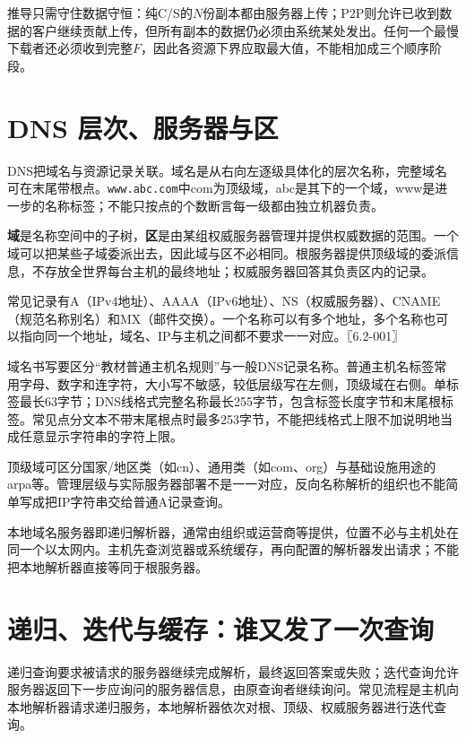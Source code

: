 推导只需守住数据守恒：纯C/S的\(N\)份副本都由服务器上传；P2P则允许已收到数据的客户继续贡献上传，但所有副本的数据仍必须由系统某处发出。任何一个最慢下载者还必须收到完整\(F\)，因此各资源下界应取最大值，不能相加成三个顺序阶段。

\section{DNS 层次、服务器与区}\label{CN06-02}

DNS把域名与资源记录关联。域名是从右向左逐级具体化的层次名称，完整域名可在末尾带根点。\texttt{www.\allowbreak{}abc.\allowbreak{}com}中com为顶级域，abc是其下的一个域，www是进一步的名称标签；不能只按点的个数断言每一级都由独立机器负责。

\begin{definition}[域与权威区]

\textbf{域}是名称空间中的子树，\textbf{区}是由某组权威服务器管理并提供权威数据的范围。一个域可以把某些子域委派出去，因此域与区不必相同。根服务器提供顶级域的委派信息，不存放全世界每台主机的最终地址；权威服务器回答其负责区内的记录。

\end{definition}

常见记录有A（IPv4地址）、AAAA（IPv6地址）、NS（权威服务器）、CNAME（规范名称别名）和MX（邮件交换）。一个名称可以有多个地址，多个名称也可以指向同一个地址，域名、IP与主机之间都不要求一一对应。〖6.2-001〗

域名书写要区分``教材普通主机名规则''与一般DNS记录名称。普通主机名标签常用字母、数字和连字符，大小写不敏感，较低层级写在左侧，顶级域在右侧。单标签最长63字节；DNS线格式完整名称最长255字节，包含标签长度字节和末尾根标签。常见点分文本不带末尾根点时最多253字节，不能把线格式上限不加说明地当成任意显示字符串的字符上限。

顶级域可区分国家/地区类（如cn）、通用类（如com、org）与基础设施用途的arpa等。管理层级与实际服务器部署不是一一对应，反向名称解析的组织也不能简单写成把IP字符串交给普通A记录查询。

本地域名服务器即递归解析器，通常由组织或运营商等提供，位置不必与主机处在同一个以太网内。主机先查浏览器或系统缓存，再向配置的解析器发出请求；不能把本地解析器直接等同于根服务器。

\section{递归、迭代与缓存：谁又发了一次查询}\label{CN06-03}

递归查询要求被请求的服务器继续完成解析，最终返回答案或失败；迭代查询允许服务器返回下一步应询问的服务器信息，由原查询者继续询问。常见流程是主机向本地解析器请求递归服务，本地解析器依次对根、顶级、权威服务器进行迭代查询。

